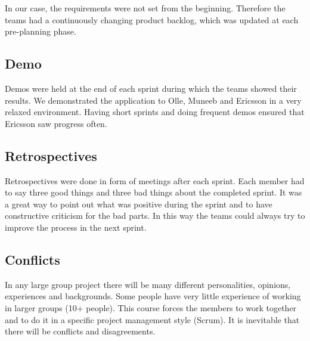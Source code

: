 In our case, the requirements were not set from the beginning. Therefore the teams had a continuously
changing product backlog, which was updated at each pre-planning phase.

\subsection{Demo}
Demos were held at the end of each sprint during which the teams showed their results.
We demonstrated the application to Olle, Muneeb and Ericsson in a very relaxed environment. Having short sprints and doing frequent
demos ensured that Ericsson saw progress often.

\subsection{Retrospectives}
Retrospectives were done in form of meetings after each sprint. Each member had to say three good things and three bad things about
the completed sprint. It was a great way to point out what was positive during the sprint
and to have constructive criticism for the bad parts. In this way the teams could always try to improve the process in the next sprint.

\subsection{Conflicts}
In any large group project there will be many different personalities, opinions, experiences and backgrounds. Some people have very little experience of working in larger groups (10+ people). This course forces the members to work together and to do it in a specific project management style (Scrum). It is inevitable that there will be conflicts and disagreements. 

